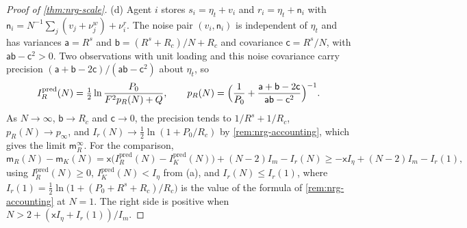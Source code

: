 \begin{proof}[Proof of \cref{thm:nrg-scale}]
(d) Agent $i$ stores $s_i=\eta_t+v_i$ and $r_i=\eta_t+\mathsf n_i$ with $\mathsf n_i=N^{-1}\sum_j(v_j+\nu^w_j)+\nu^r_i$. The noise pair $(v_i,\mathsf n_i)$ is independent of $\eta_t$ and has variances $\mathsf a=R^s$ and $\mathsf b=(R^s+R_c)/N+R_c$ and covariance $\mathsf c=R^s/N$, with $\mathsf a\mathsf b-\mathsf c^2>0$. Two observations with unit loading and this noise covariance carry precision $(\mathsf a+\mathsf b-2\mathsf c)/(\mathsf a\mathsf b-\mathsf c^2)$ about $\eta_t$, so
\[
I^{\mathrm{pred}}_R(N)=\tfrac12\ln\frac{P_0}{F^2p_R(N)+Q},\qquad p_R(N)=\Bigl(\frac1{P_0}+\frac{\mathsf a+\mathsf b-2\mathsf c}{\mathsf a\mathsf b-\mathsf c^2}\Bigr)^{-1}.
\]
As $N\to\infty$, $\mathsf b\to R_c$ and $\mathsf c\to0$, the precision tends to $1/R^s+1/R_c$, $p_R(N)\to p_\infty$, and $I_r(N)\to\tfrac12\ln(1+P_0/R_c)$ by \cref{rem:nrg-accounting}, which gives the limit $\mathsf m_R^\infty$. For the comparison,
\[
\mathsf m_R(N)-\mathsf m_K(N)=\mathsf x\bigl(I^{\mathrm{pred}}_R(N)-I^{\mathrm{pred}}_K(N)\bigr)+(N-2)I_m-I_r(N)\ge-\mathsf xI_\eta+(N-2)I_m-I_r(1),
\]
using $I^{\mathrm{pred}}_R(N)\ge0$, $I^{\mathrm{pred}}_K(N)<I_\eta$ from (a), and $I_r(N)\le I_r(1)$, where $I_r(1)=\tfrac12\ln\bigl(1+(P_0+R^s+R_c)/R_c\bigr)$ is the value of the formula of \cref{rem:nrg-accounting} at $N=1$. The right side is positive when $N>2+(\mathsf xI_\eta+I_r(1))/I_m$.
\end{proof}

